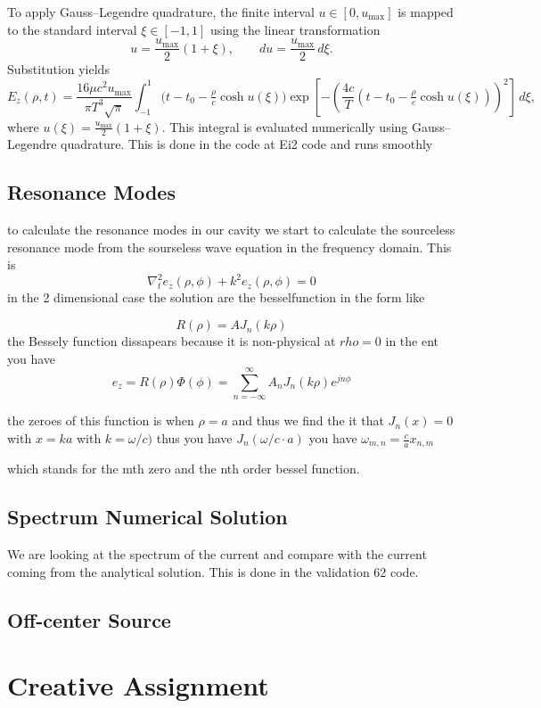 \documentclass{article}
\begin{document}
To apply Gauss--Legendre quadrature, the finite interval
$u\in[0,u_{\max}]$ is mapped to the standard interval
$\xi\in[-1,1]$ using the linear transformation
\begin{equation}
u = \frac{u_{\max}}{2}(1+\xi),
\qquad
du = \frac{u_{\max}}{2}\,d\xi.
\end{equation}
Substitution yields
\begin{equation}
E_z(\rho,t)
= \frac{16\mu c^2 u_{\max}}{\pi T^3\sqrt{\pi}}
\int_{-1}^{1}
\bigl(t-t_0-\tfrac{\rho}{c}\cosh u(\xi)\bigr)
\exp\!\left[
-\left(
\frac{4c}{T}
\left(t-t_0-\tfrac{\rho}{c}\cosh u(\xi)\right)
\right)^2
\right]
\,d\xi,
\end{equation}
where $u(\xi)=\tfrac{u_{\max}}{2}(1+\xi)$. This integral is evaluated
numerically using Gauss--Legendre quadrature. This is done in the code at Ei2 code and runs smoothly

\subsection{Resonance Modes}
to calculate the resonance modes in our cavity we start to calculate the sourceless resonance mode from the sourseless wave equation in the frequency domain.
This is
\begin{equation}
\nabla_t^2e_z(\rho,\phi) +k^2e_z(\rho,\phi)=0
\end{equation}
in the 2 dimensional case the solution are the besselfunction in the form like

\begin{equation}
R(\rho)= AJ_n(k\rho)
\end{equation}
the Bessely function dissapears because it is non-physical at $rho=0$
in the ent you have \[e_z=R(\rho)\Phi(\phi)=\sum^{\infty}_{n=-\infty}A_nJ_n(k\rho)e^{jn\phi}\]

the zeroes of this function is when $\rho=a$ and thus we find the it that
$J_n(x)=0$ with $x = ka$ with $k=\omega/c)$ thus you have $J_n(\omega/c\cdot a)$ you have $\omega_{m,n}=\frac{c}{a}x_{n,m}$

which stands for the mth zero and the nth order bessel function.

\subsection{Spectrum Numerical Solution}
We are looking at the spectrum of the current and compare with the current coming from the analytical solution. This is done in the validation 62 code.
\subsection{Off-center Source}


\section{Creative Assignment}
\end{document}
